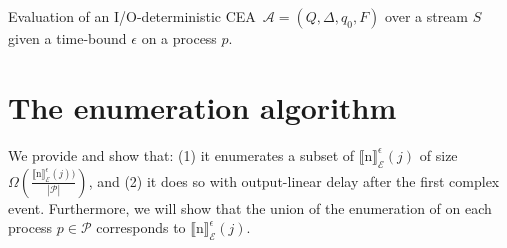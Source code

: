 \begin{algorithm}[H]
  \DontPrintSemicolon
  \SetAlgoNoEnd %
  \SetAlgoNoLine %
  \;
  \;
  \;
\caption{Evaluation of an I/O-deterministic \mbox{CEA ${\mathcal{A} = (Q, \Delta, q_{0}, F)}$} over a stream $S$ given a time-bound $\epsilon$ on a process $p$.}
\label{algo:update}
\end{algorithm}


\section{The enumeration algorithm}\label{sec:enumeration}

We provide  and show that: (1) it enumerates a subset of ${\llbracket \text{n} \rrbracket}^{\epsilon}_{\mathcal{E}}(j)$ of size $\Omega(\frac{{\llbracket \text{n} \rrbracket}^{\epsilon}_{\mathcal{E}}(j))}{|\mathcal{P}|})$, and (2) it does so with output-linear delay after the first complex event. Furthermore, we will show that the union of the enumeration of  on each process $p \in \mathcal{P}$ corresponds to ${\llbracket \text{n} \rrbracket}^{\epsilon}_{\mathcal{E}}(j)$.

